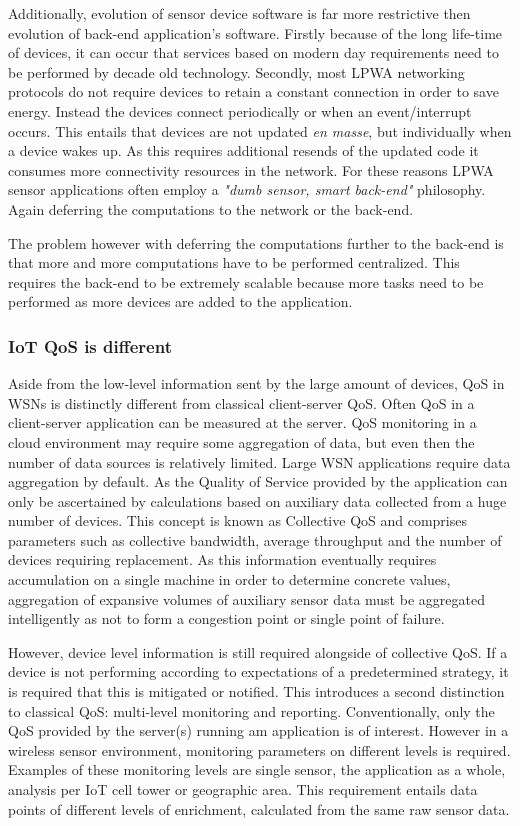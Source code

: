 Additionally, evolution of sensor device software is far more restrictive then evolution of back-end application's software. Firstly because of the long life-time of devices, it can occur that services based on modern day requirements need to be performed by decade old technology. Secondly, most LPWA networking protocols do not require devices to retain a constant connection in order to save energy\cite{tmobile, vodafone, iets met nbiot specs}. Instead the devices connect periodically or when an event/interrupt occurs. This entails that devices are not updated \emph{en masse}, but individually when a device wakes up. As this requires additional resends of the updated code it consumes more connectivity resources in the network. For these reasons LPWA sensor applications often employ a \emph{"dumb sensor, smart back-end"} philosophy. Again deferring the computations to the network or the back-end.

The problem however with deferring the computations further to the back-end is that more and more computations have to be performed centralized. This requires the back-end to be extremely scalable because more tasks need to be performed as more devices are added to the application.

\subsubsection{IoT QoS is different}
Aside from the low-level information sent by the large amount of devices, QoS in WSNs is distinctly different from classical client-server QoS. Often QoS in a client-server application can be measured at the server. QoS monitoring in a cloud environment may require some aggregation of data, but even then the number of data sources is relatively limited. Large WSN applications require data aggregation by default. As the Quality of Service provided by the application can only be ascertained by calculations based on auxiliary data collected from a huge number of devices. This concept is known as Collective QoS\cite{qos_specific_wsn} and comprises parameters such as collective bandwidth, average throughput and the number of devices requiring replacement. As this information eventually requires accumulation on a single machine in order to determine concrete values, aggregation of expansive volumes of auxiliary sensor data must be aggregated intelligently as not to form a congestion point or single point of failure.

However, device level information is still required alongside of collective QoS. If a device is not performing according to expectations of a predetermined strategy, it is required that this is mitigated or notified. This introduces a second distinction to classical QoS: multi-level monitoring and reporting. Conventionally, only the QoS provided by the server(s) running am application is of interest. However in a wireless sensor environment, monitoring parameters on different levels is required. Examples of these monitoring levels are single sensor, the application as a whole, analysis per IoT cell tower or geographic area. This requirement entails data points of different levels of enrichment, calculated from the same raw sensor data.

